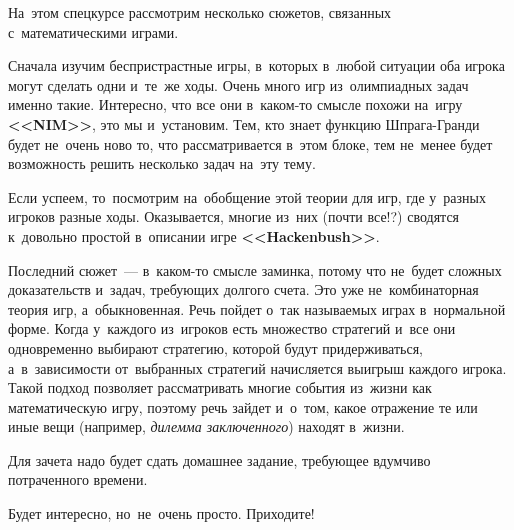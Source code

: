 



На~этом спецкурсе рассмотрим несколько сюжетов, связанных с~математическими
играми.

Сначала изучим беспристрастные игры, в~которых в~любой ситуации оба игрока
могут сделать одни и~те~же ходы.
Очень много игр из~олимпиадных задач именно такие.
Интересно, что все они в~каком-то смысле похожи на~игру \textbf{<<NIM>>}, это
мы и~установим.
Тем, кто знает функцию Шпрага-Гранди будет не~очень ново то, что
рассматривается в~этом блоке, тем не~менее будет возможность решить несколько
задач на~эту тему.

Если успеем, то~посмотрим на~обобщение этой теории для игр, где у~разных
игроков разные ходы.
Оказывается, многие из~них (почти все!?) сводятся к~довольно простой в~описании
игре \textbf{<<Hackenbush>>}.

Последний сюжет~--- в~каком-то смысле заминка, потому что не~будет сложных
доказательств и~задач, требующих долгого счета.
Это уже не~комбинаторная теория игр, а~обыкновенная.
Речь пойдет о~так называемых играх в~нормальной форме.
Когда у~каждого из~игроков есть множество стратегий и~все они одновременно
выбирают стратегию, которой будут придерживаться, а~в~зависимости от~выбранных
стратегий начисляется выигрыш каждого игрока.
Такой подход позволяет рассматривать многие события из~жизни как математическую
игру, поэтому речь зайдет и~о~том, какое отражение те или иные вещи
(например, \emph{дилемма заключенного}) находят в~жизни.

Для зачета надо будет сдать домашнее задание, требующее вдумчиво потраченного
времени.

Будет интересно, но~не~очень просто.
Приходите!

